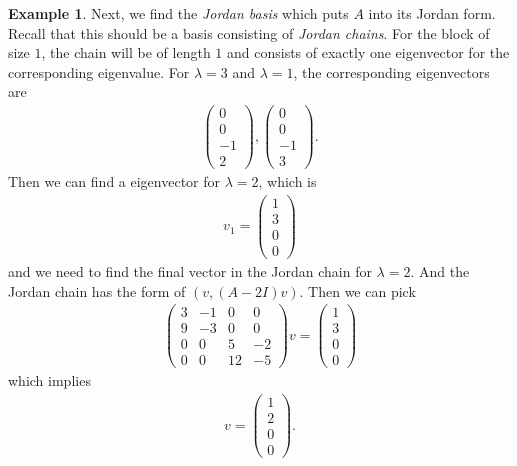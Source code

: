 \documentclass[11pt]{book}
\theoremstyle{definition}
\newtheorem{example}{Example}[section]
\numberwithin{equation}{chapter}
\begin{document}
\begin{example}
Next, we find the \emph{Jordan basis} which puts $A$ into its Jordan form. Recall that this should be a basis consisting of \emph{Jordan chains}. For the block of size $1$, the chain will be of length $1$ and consists of exactly one eigenvector for the corresponding eigenvalue. For $\lambda = 3$ and $\lambda = 1$, the corresponding eigenvectors are 
\begin{align*}
    \begin{pmatrix}
    0 \\
    0 \\
    -1 \\
    2
    \end{pmatrix}, \begin{pmatrix}
    0 \\
    0 \\
    -1 \\
    3
    \end{pmatrix}.
\end{align*}
Then we can find a eigenvector for $\lambda = 2$, which is 
\begin{align*}
    v_1 = \begin{pmatrix}
    1 \\
    3 \\
    0 \\
    0
    \end{pmatrix}
\end{align*}
and we need to find the final vector in the Jordan chain for $\lambda = 2$. And the Jordan chain has the form of $(v, (A-2I)v)$. Then we can pick 
\begin{align*}
    \begin{pmatrix}
    3 & -1 & 0 & 0 \\
    9 & -3 & 0 & 0 \\
    0 & 0 & 5 & -2 \\
    0 & 0 & 12 & -5
    \end{pmatrix} v = \begin{pmatrix}
    1 \\
    3 \\
    0 \\
    0
    \end{pmatrix}
\end{align*}
which implies 
\begin{align*}
    v = \begin{pmatrix}
    1 \\
    2 \\
    0 \\
    0
    \end{pmatrix}.

\end{align*}
\end{example}
\end{document}
